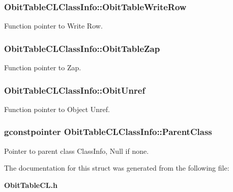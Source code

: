 \subsubsection{ {\bf Obit\-Table\-CLClass\-Info::Obit\-Table\-Write\-Row}}\label{structObitTableCLClassInfo_o26}


Function pointer to Write Row. 

\subsubsection{ {\bf Obit\-Table\-CLClass\-Info::Obit\-Table\-Zap}}\label{structObitTableCLClassInfo_o19}


Function pointer to Zap. 

\subsubsection{ {\bf Obit\-Table\-CLClass\-Info::Obit\-Unref}}\label{structObitTableCLClassInfo_o11}


Function pointer to Object Unref. 

\subsubsection{\setlength{\rightskip}{0pt plus 5cm}gconstpointer {\bf Obit\-Table\-CLClass\-Info::Parent\-Class}}\label{structObitTableCLClassInfo_o3}


Pointer to parent class Class\-Info, Null if none. 



The documentation for this struct was generated from the following file:\begin{CompactItemize}
\item 
{\bf Obit\-Table\-CL.h}\end{CompactItemize}
